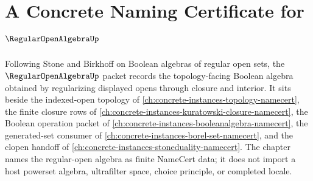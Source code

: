\chapter{A Concrete Naming Certificate for $\RegularOpenAlgebraUp$}
\label{ch:concrete-instances-regular-open-algebra-namecert}

Following Stone and Birkhoff on Boolean algebras of regular open sets, the $\RegularOpenAlgebraUp$ packet records the topology-facing Boolean algebra obtained by regularizing displayed opens through closure and interior. It sits beside the indexed-open topology of \autoref{ch:concrete-instances-topology-namecert}, the finite closure rows of \autoref{ch:concrete-instances-kuratowski-closure-namecert}, the Boolean operation packet of \autoref{ch:concrete-instances-booleanalgebra-namecert}, the generated-set consumer of \autoref{ch:concrete-instances-borel-set-namecert}, and the clopen handoff of \autoref{ch:concrete-instances-stoneduality-namecert}. The chapter names the regular-open algebra as finite NameCert data; it does not import a host powerset algebra, ultrafilter space, choice principle, or completed locale.

